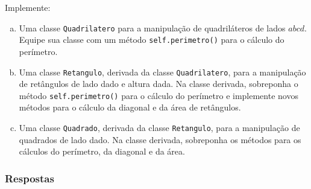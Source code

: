 \begin{exer}
  Implemente:
  \begin{enumerate}[a)]
  \item Uma classe \lstinline+Quadrilatero+ para a manipulação de quadriláteros de lados $abcd$. Equipe sua classe com um método \lstinline+self.perimetro()+ para o cálculo do perímetro.
  \item Uma classe \lstinline+Retangulo+, derivada da classe \lstinline+Quadrilatero+, para a manipulação de retângulos de lado dado e altura dada. Na classe derivada, sobreponha o método \lstinline+self.perimetro()+ para o cálculo do perímetro e implemente novos métodos para o cálculo da diagonal e da área de retângulos.
  \item Uma classe \lstinline+Quadrado+, derivada da classe \lstinline+Retangulo+, para a manipulação de quadrados de lado dado. Na classe derivada, sobreponha os métodos para os cálculos do perímetro, da diagonal e da área.
  \end{enumerate}
\end{exer}

\ifisbook
\subsubsection{Respostas}
\shipoutAnswer
\fi
